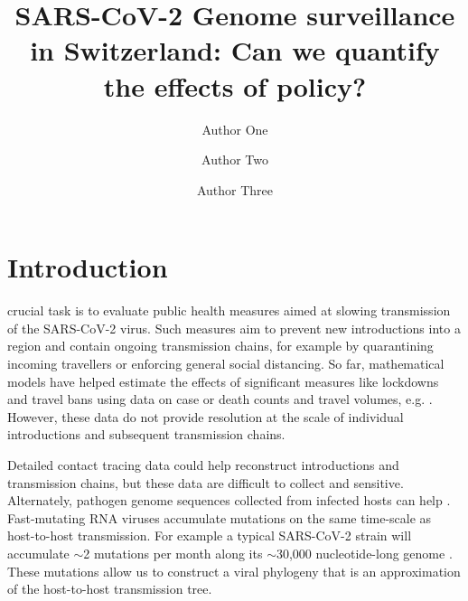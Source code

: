 \documentclass[9pt,twocolumn,twoside,lineno]{pnas-new}
\title{SARS-CoV-2 Genome surveillance in Switzerland: Can we quantify the effects of policy?}
\author[a,c,1]{Author One}
\author[b,1,2]{Author Two}
\author[a]{Author Three}
\affil[a]{Affiliation One}
\affil[b]{Affiliation Two}
\affil[c]{Affiliation Three}
\begin{document}
\maketitle
\thispagestyle{firststyle}



\section{Introduction}

 crucial task is to evaluate public health measures aimed at slowing transmission of the SARS-CoV-2 virus. Such measures aim to prevent new introductions into a region and contain ongoing transmission chains, for example by quarantining incoming travellers or enforcing general social distancing. So far, mathematical models have helped estimate the effects of significant measures like lockdowns and travel bans using data on case or death counts and travel volumes, e.g. \cite{Flaxman2020, Tian2020}. However, these data do not provide resolution at the scale of individual introductions and subsequent transmission chains.

Detailed contact tracing data could help reconstruct introductions and transmission chains, but these data are difficult to collect and sensitive. Alternately, pathogen genome sequences collected from infected hosts can help \cite{Kraemer}. Fast-mutating RNA viruses accumulate mutations on the same time-scale as host-to-host transmission. For example a typical SARS-CoV-2 strain will accumulate $\sim$2 mutations per month along its $\sim$30,000 nucleotide-long genome \cite{Nextstrainteam}. These mutations allow us to construct a viral phylogeny that is an approximation of the host-to-host transmission tree. 
\end{document}
